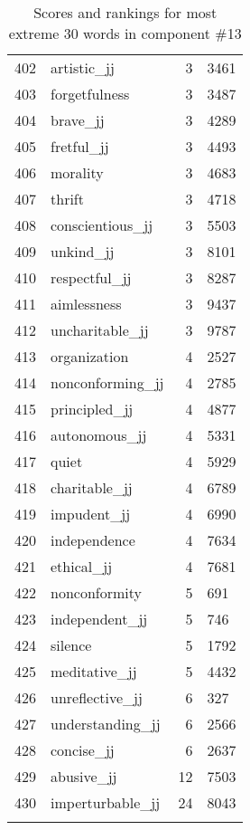 \begin{longtable}[!htbp]{| rlr@{.}l |}
    402 & artistic\_jj & 3 & 3461 \\
    403 & forgetfulness & 3 & 3487 \\
    404 & brave\_jj & 3 & 4289 \\
    405 & fretful\_jj & 3 & 4493 \\
    406 & morality & 3 & 4683 \\
    407 & thrift & 3 & 4718 \\
    408 & conscientious\_jj & 3 & 5503 \\
    409 & unkind\_jj & 3 & 8101 \\
    410 & respectful\_jj & 3 & 8287 \\
    411 & aimlessness & 3 & 9437 \\
    412 & uncharitable\_jj & 3 & 9787 \\
    413 & organization & 4 & 2527 \\
    414 & nonconforming\_jj & 4 & 2785 \\
    415 & principled\_jj & 4 & 4877 \\
    416 & autonomous\_jj & 4 & 5331 \\
    417 & quiet & 4 & 5929 \\
    418 & charitable\_jj & 4 & 6789 \\
    419 & impudent\_jj & 4 & 6990 \\
    420 & independence & 4 & 7634 \\
    421 & ethical\_jj & 4 & 7681 \\
    422 & nonconformity & 5 & 691 \\
    423 & independent\_jj & 5 & 746 \\
    424 & silence & 5 & 1792 \\
    425 & meditative\_jj & 5 & 4432 \\
    426 & unreflective\_jj & 6 & 327 \\
    427 & understanding\_jj & 6 & 2566 \\
    428 & concise\_jj & 6 & 2637 \\
    429 & abusive\_jj & 12 & 7503 \\
    430 & imperturbable\_jj & 24 & 8043 \\
    \hline
    \caption{Scores and rankings for most extreme 30 words in component \#13} \\
\end{longtable}
